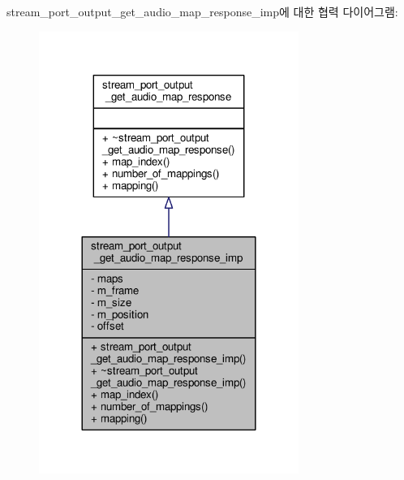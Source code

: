 stream\+\_\+port\+\_\+output\+\_\+get\+\_\+audio\+\_\+map\+\_\+response\+\_\+imp에 대한 협력 다이어그램\+:
\nopagebreak
\begin{figure}[H]
\begin{center}
\leavevmode
\includegraphics[width=240pt]{classavdecc__lib_1_1stream__port__output__get__audio__map__response__imp__coll__graph}
\end{center}
\end{figure}
